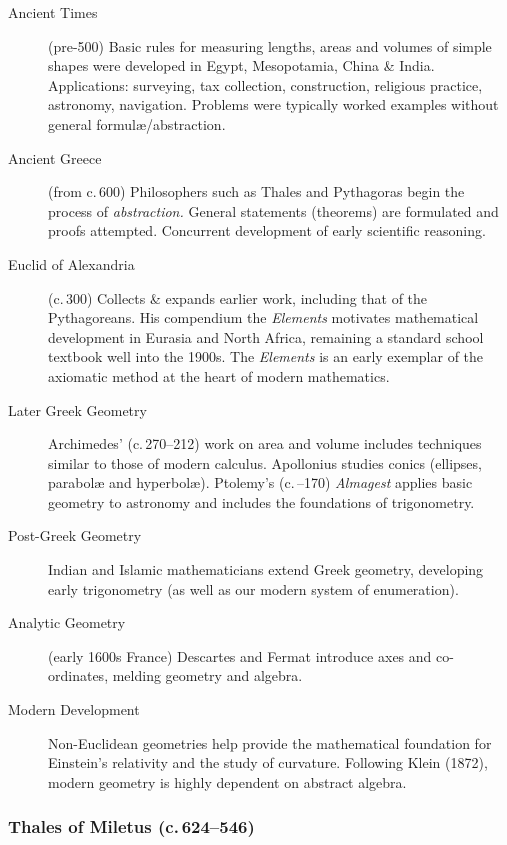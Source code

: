 \begin{description}
	\item[Ancient Times] (pre-500\BC) Basic rules for measuring lengths, areas and volumes of simple shapes were developed in Egypt, Mesopotamia, China \& India. Applications: surveying, tax collection, construction, religious practice, astronomy, navigation. Problems were typically worked examples without general formulæ/abstraction.
	
	\item[Ancient Greece] (from c.\,600\BC) Philosophers such as Thales and Pythagoras begin the process of \emph{abstraction.} General statements (theorems) are formulated and proofs attempted. Concurrent development of early scientific reasoning.
	
	\item[Euclid of Alexandria] (c.\,300\BC) Collects \& expands earlier work, including that of the Pythag\-oreans. His compendium the \emph{Elements} motivates mathematical development in Eurasia and North Africa, remaining a standard school textbook well into the 1900s. The \emph{Elements} is an early exemplar of the axiomatic method at the heart of modern mathematics.
	
	\item[Later Greek Geometry] Archimedes' (c.\,270--212\BC) work on area and volume includes techniques similar to those of modern calculus. Apollonius studies conics (ellipses, parabolæ and hyperbolæ). Ptolemy's (c.\,--170) \emph{Almagest} applies basic geometry to astronomy and includes the foundations of trigonometry.
	
	\item[Post-Greek Geometry] Indian and Islamic mathematicians extend Greek geometry, developing early trigonometry (as well as our modern system of enumeration).
	
	\item[Analytic Geometry] (early 1600s France) Descartes and Fermat introduce axes and co-ordinates, melding geometry and algebra.
 	
	\item[Modern Development] Non-Euclidean geometries help provide the mathematical foundation for Einstein's relativity and the study of curvature. Following Klein (1872), modern geometry is highly dependent on abstract algebra.
\end{description}



\subsubsection*{Thales of Miletus (c.\,624--546\BC)}\label{pg:thales}

